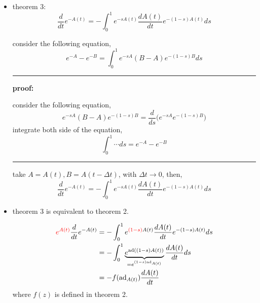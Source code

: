 \begin{itemize}
	\item theorem 3:
	\begin{equation}
		\frac{d}{dt} e^{- A(t)} = - \int_0^1 e^{- s A(t)} \frac{d A(t)}{dt} e^{- (1 - s) A(t)} ds
	\end{equation}
	
	\begin{tcolorbox}[title=proof:]
		consider the following equation,
		\begin{equation}
			e^{- A} - e^{- B} = \int_0^1 e^{- s A} (B - A) e^{- (1 - s) B} ds
		\end{equation}
		
		\noindent\rule[0.5ex]{\linewidth}{0.5pt} %
		
		\textbf{proof:}
		
		consider the following equation,
		\begin{equation}
			e^{- s A} (B - A) e^{- (1 - s) B} = \frac{d}{ds} \Big( e^{- s A} e^{- (1 - s) B} \Big)
		\end{equation}
		integrate both side of the equation,
		\begin{equation}
			\int_0^1 \cdots ds = e^{- A} - e^{- B}
		\end{equation}
		
		\noindent\rule[0.5ex]{\linewidth}{0.5pt} %
		
		take $A = A(t), B = A(t - \Delta t)$, with $\Delta t \rightarrow 0$, then,
		\begin{equation}
			\frac{d}{dt} e^{- A(t)} = - \int_0^1 e^{- s A(t)} \frac{d A(t)}{dt} e^{- (1 - s) A(t)} ds
		\end{equation}
	\end{tcolorbox}
	
	\item theorem 3 is equivalent to theorem 2.
	
	\begin{tcolorbox}[title=calculation:]
		\begin{align} 
			\mathcolor{red}{e^{A(t)}} \frac{d}{dt} e^{- A(t)} &= - \int_0^1 e^{\mathcolor{red}{(1 - s)} A(t)} \frac{d A(t)}{dt} e^{- (1 - s) A(t)} ds \notag \\
			&= - \int_0^1 \underbrace{e^{\mathrm{ad}((1 - s) A(t))}}_{= e^{(1 - s) \mathrm{ad}_{A(t)}}} \frac{d A(t)}{dt} ds \notag \\
			&= - f(\mathrm{ad}_{A(t)}) \frac{d A(t)}{dt}
		\end{align}
		where $f(z)$ is defined in theorem 2.
	\end{tcolorbox}
	

\end{itemize}
